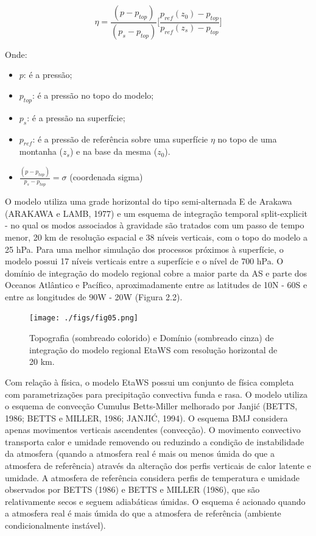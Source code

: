 \begin{equation}
\eta=\frac{(p-p_{top})}{(p_{s}-p_{top})}\bigg[\frac{p_{ref}(z_{0})-p_{top}}{p_{ref}(z_{s})-p_{top}}\bigg]
\label{form09}
\end{equation}

Onde:

\begin{itemize}
\item $p$: é a pressão;
\item $p_{top}$: é a pressão no topo do modelo;
\item $p_{s}$: é a pressão na superfície;
\item $p_{ref}$: é a pressão de referência sobre uma superfície $\eta$ no topo de uma montanha ($z_{s}$) e na base da mesma ($z_{0}$).
\item $\frac{(p-p_{top})}{p_{s}-p_{top}}=\sigma$ (coordenada sigma)
\end{itemize}

O modelo utiliza uma grade horizontal do tipo semi-alternada E de Arakawa (ARAKAWA e LAMB, 1977) e um esquema de integração temporal split-explicit - no qual os modos associados à gravidade são tratados com um passo de tempo menor, 20 km de resolução espacial e 38 níveis verticais, com o topo do modelo a 25 hPa. Para uma melhor simulação dos processos próximos à superfície, o modelo possui 17 níveis verticais entre a superfície e o nível de 700 hPa. O domínio de integração do modelo regional cobre a maior parte da AS e parte dos Oceanos Atlântico e Pacífico, aproximadamente entre as latitudes de 10N - 60S e entre as longitudes de 90W - 20W (Figura 2.2). 

\begin{figure}
\centering
\texttt{[image: ./figs/fig05.png]}
\caption{Topografia (sombreado colorido) e Domínio (sombreado cinza) de integração do modelo regional EtaWS com resolução horizontal de 20 km.}
\label{fig05}
\end{figure}

Com relação à física, o modelo EtaWS possui um conjunto de física completa com parametrizações para precipitação convectiva funda e rasa. O modelo utiliza o esquema de convecção Cumulus Betts-Miller melhorado por Janji\'{c} (BETTS, 1986; BETTS e MILLER, 1986; JANJI\'{C}, 1994). O esquema BMJ considera apenas movimentos verticais ascendentes (convecção). O movimento convectivo transporta calor e umidade removendo ou reduzindo a condição de instabilidade da atmosfera (quando a atmosfera real é mais ou menos úmida do que a atmosfera de referência) através da alteração dos perfis verticais de calor latente e umidade. A atmosfera de referência considera perfis de temperatura e umidade observados por BETTS (1986) e BETTS e MILLER (1986), que são relativamente secos e seguem adiabáticas úmidas. O esquema é acionado quando a atmosfera real é mais úmida do que a atmosfera de referência (ambiente condicionalmente instável).

